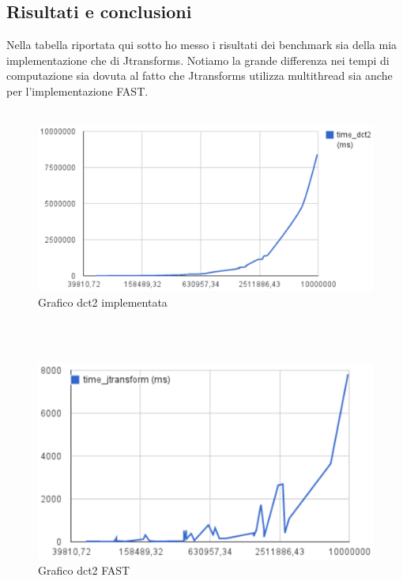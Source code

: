 \documentclass[12pt]{article}
\begin{document}
\subsection{Risultati e conclusioni}
Nella tabella riportata qui sotto ho messo i risultati dei benchmark sia della mia implementazione che di Jtransforms.
Notiamo la grande differenza nei tempi di computazione sia dovuta al fatto che Jtransforms utilizza multithread sia anche per l'implementazione FAST.
\\\\
\begin{figure}[htbp]
\centering
\includegraphics{grafico_dct2.eps}
\caption{Grafico dct2 implementata}
\end{figure}
\\\\
\begin{figure}[htbp]
\centering
\includegraphics{grafico_jtransform.eps}
\caption{Grafico dct2 FAST}
\end{figure}
\\\\
\end{document}
